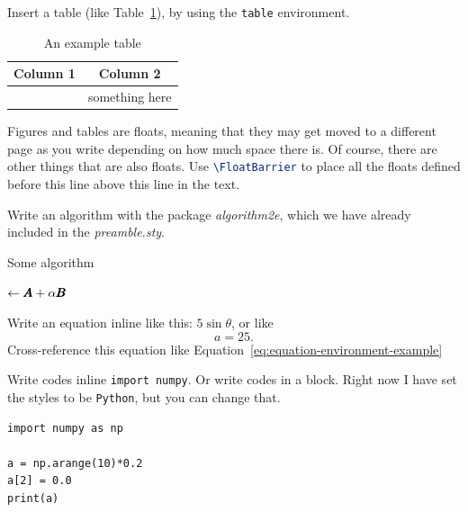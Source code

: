 Insert a table (like Table~\ref{tab:example}), by using the \lstinline[language=tex]!table! environment.
\begin{table}
    \centering
    \caption{An example table}\label{tab:example}
    \begin{tabular}{|c|c|}
        \hline
        \textbf{Column 1} & \textbf{Column 2} \\
        \hline
         & something here \\
        \hline
    \end{tabular}
\end{table}

\FloatBarrier%
Figures and tables are floats, meaning that they may get moved to a different page as you write depending on how much space there is. 
Of course, there are other things that are also floats.
Use \lstinline[language=tex]!\FloatBarrier! to place all the floats defined before this line above this line in the text. 

Write an algorithm with the package \emph{algorithm2e}, which we have already included in the \emph{preamble.sty}.


\begin{algorithm}
\caption{Some algorithm}\label{algo:example}


\out $\gets \pmb{A} +\alpha \pmb{B}$ 

\KwRet\out%

\end{algorithm}

Write an equation inline like this: $5\sin{\theta}$, or like 
\begin{equation}
    a = 25.
    \label{eq:equation-environment-example}
\end{equation}
Cross-reference this equation like Equation~\eqref{eq:equation-environment-example}

Write codes inline \lstinline!import numpy!.
Or write codes in a block.
Right now I have set the styles to be \lstinline{Python}, but you can change that.
\begin{lstlisting}
import numpy as np

a = np.arange(10)*0.2
a[2] = 0.0
print(a)
\end{lstlisting}

